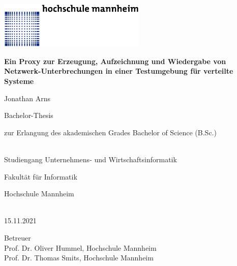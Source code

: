 \documentclass[12pt,a4paper]{report}
\begin{document}
\begin{titlepage}
    \noindent\includegraphics[width=7cm]{img/hs_logo.png}
    \begin{center}
        \sffamily
        \Large
        \textbf{Ein Proxy zur Erzeugung, Aufzeichnung und Wiedergabe von Netzwerk-Unterbrechungen in einer Testumgebung für verteilte Systeme}

        \vspace{1cm}

        \large
        \begin{Large}Jonathan Arns\end{Large}

        \vspace{1.5cm}
                
        
        Bachelor-Thesis\\
        \begin{small}zur Erlangung des akademischen Grades Bachelor of Science (B.Sc.)\end{small}\\
        Studiengang Unternehmens- und Wirtschaftsinformatik

        \vspace{1cm}
                
        Fakultät für Informatik\\
        \begin{Large}Hochschule Mannheim\end{Large}\\
        
        \vspace{1cm}
        15.11.2021

        \vfill

        Betreuer\\
        Prof. Dr. Oliver Hummel, Hochschule Mannheim\\
        Prof. Dr. Thomas Smits, Hochschule Mannheim\\
   \end{center}
\end{titlepage}

\tableofcontents
\setlength{\parindent}{0em}
\setlength{\parskip}{0.6em}

\end{document}
